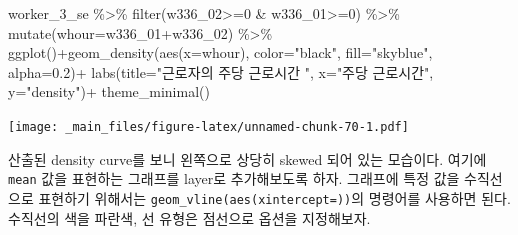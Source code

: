 \documentclass[
]{book}
\newenvironment{Shaded}{\begin{snugshade}}{\end{snugshade}}
\newcommand{\AttributeTok}[1]{\textcolor[rgb]{0.77,0.63,0.00}{#1}}
\newcommand{\DecValTok}[1]{\textcolor[rgb]{0.00,0.00,0.81}{#1}}
\newcommand{\FloatTok}[1]{\textcolor[rgb]{0.00,0.00,0.81}{#1}}
\newcommand{\FunctionTok}[1]{\textcolor[rgb]{0.00,0.00,0.00}{#1}}
\newcommand{\NormalTok}[1]{#1}
\newcommand{\SpecialCharTok}[1]{\textcolor[rgb]{0.00,0.00,0.00}{#1}}
\newcommand{\StringTok}[1]{\textcolor[rgb]{0.31,0.60,0.02}{#1}}
\theoremstyle{definition}
\theoremstyle{definition}
\theoremstyle{definition}
\theoremstyle{definition}
\theoremstyle{remark}
\begin{document}
\begin{Shaded}
\begin{Highlighting}[]
\NormalTok{worker\_3\_se }\SpecialCharTok{\%\textgreater{}\%} 
  \FunctionTok{filter}\NormalTok{(w336\_02}\SpecialCharTok{\textgreater{}=}\DecValTok{0} \SpecialCharTok{\&}\NormalTok{ w336\_01}\SpecialCharTok{\textgreater{}=}\DecValTok{0}\NormalTok{) }\SpecialCharTok{\%\textgreater{}\%} 
  \FunctionTok{mutate}\NormalTok{(}\AttributeTok{whour=}\NormalTok{w336\_01}\SpecialCharTok{+}\NormalTok{w336\_02) }\SpecialCharTok{\%\textgreater{}\%} 
  \FunctionTok{ggplot}\NormalTok{()}\SpecialCharTok{+}\FunctionTok{geom\_density}\NormalTok{(}\FunctionTok{aes}\NormalTok{(}\AttributeTok{x=}\NormalTok{whour), }\AttributeTok{color=}\StringTok{"black"}\NormalTok{, }\AttributeTok{fill=}\StringTok{"skyblue"}\NormalTok{, }\AttributeTok{alpha=}\FloatTok{0.2}\NormalTok{)}\SpecialCharTok{+}
  \FunctionTok{labs}\NormalTok{(}\AttributeTok{title=}\StringTok{"근로자의 주당 근로시간 "}\NormalTok{, }\AttributeTok{x=}\StringTok{"주당 근로시간"}\NormalTok{, }\AttributeTok{y=}\StringTok{"density"}\NormalTok{)}\SpecialCharTok{+}
  \FunctionTok{theme\_minimal}\NormalTok{()}
\end{Highlighting}
\end{Shaded}

\texttt{[image: \_main\_files/figure-latex/unnamed-chunk-70-1.pdf]}

산출된 density curve를 보니 왼쪽으로 상당히 skewed 되어 있는 모습이다. 여기에 \texttt{mean} 값을 표현하는 그래프를 layer로 추가해보도록 하자. 그래프에 특정 값을 수직선으로 표현하기 위해서는 \texttt{geom\_vline(aes(xintercept=))}의 명령어를 사용하면 된다. 수직선의 색을 파란색, 선 유형은 점선으로 옵션을 지정해보자.
\end{document}
